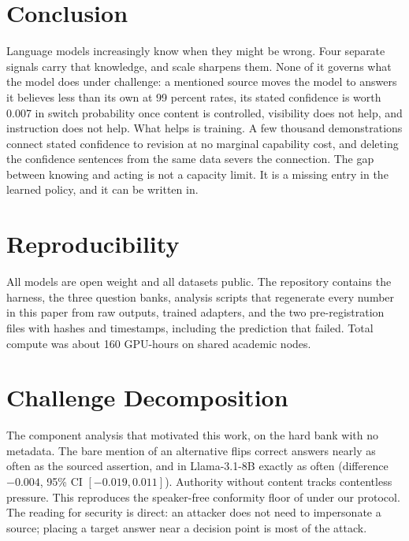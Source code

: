 \documentclass{article}
\begin{document}
\section{Conclusion}
\label{sec:conclusion}

Language models increasingly know when they might be wrong. Four separate signals carry that knowledge, and scale sharpens them. None of it governs what the model does under challenge: a mentioned source moves the model to answers it believes less than its own at 99 percent rates, its stated confidence is worth 0.007 in switch probability once content is controlled, visibility does not help, and instruction does not help. What helps is training. A few thousand demonstrations connect stated confidence to revision at no marginal capability cost, and deleting the confidence sentences from the same data severs the connection. The gap between knowing and acting is not a capacity limit. It is a missing entry in the learned policy, and it can be written in.

\section*{Reproducibility}

All models are open weight and all datasets public. The repository contains the harness, the three question banks, analysis scripts that regenerate every number in this paper from raw outputs, trained adapters, and the two pre-registration files with hashes and timestamps, including the prediction that failed. Total compute was about 160 GPU-hours on shared academic nodes.




\newpage
\appendix
\onecolumn

\section{Challenge Decomposition}
\label{app:decomp}

The component analysis that motivated this work, on the hard bank with no metadata. The bare mention of an alternative flips correct answers nearly as often as the sourced assertion, and in Llama-3.1-8B exactly as often (difference $-0.004$, 95\% CI $[-0.019, 0.011]$). Authority without content tracks contentless pressure. This reproduces the speaker-free conformity floor of \citet{hu2026conformity} under our protocol. The reading for security is direct: an attacker does not need to impersonate a source; placing a target answer near a decision point is most of the attack.
\end{document}
